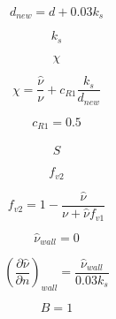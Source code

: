 

\begin{equation}
d_{new} = d + 0.03 k_s
\end{equation}

\begin{equation}
k_s
\end{equation}

\begin{equation}
\chi
\end{equation}

\begin{equation}
\chi = \frac{\hat\nu}{\nu} + c_{R1} \frac{k_s}{d_{new}}
\end{equation}

\begin{equation}
c_{R1} = 0.5
\end{equation}

\begin{equation}
\hat S
\end{equation}

\begin{equation}
f_{v2}
\end{equation}

\begin{equation}
f_{v2} = 1 - \frac{\hat \nu}{\nu + \hat \nu f_{v1}}
\end{equation}

\begin{equation}
\hat \nu_{wall} = 0
\end{equation}

\begin{equation}
\left( \frac{\partial \hat \nu}{\partial n}\right)_{wall} = \frac{\hat \nu_{wall}}{0.03 k_s} 
\end{equation}

\begin{equation}
B=1
\end{equation}


